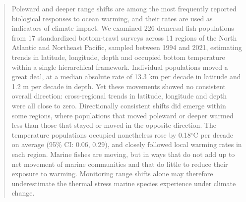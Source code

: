 \documentclass[9pt,twocolumn,twoside]{pnas-new}
\begin{document}

\begin{abstract}
Poleward and deeper range shifts are among the most frequently reported biological responses to ocean warming, and their rates are used as indicators of climate impact. We examined 226 demersal fish populations from 17 standardized bottom-trawl surveys across 11 regions of the North Atlantic and Northeast Pacific, sampled between 1994 and 2021, estimating trends in latitude, longitude, depth and occupied bottom temperature within a single hierarchical framework. Individual populations moved a great deal, at a median absolute rate of 13.3 km per decade in latitude and 1.2 m per decade in depth. Yet these movements showed no consistent overall direction: cross-regional trends in latitude, longitude and depth were all close to zero. Directionally consistent shifts did emerge within some regions, where populations that moved poleward or deeper warmed less than those that stayed or moved in the opposite direction. The temperature populations occupied nonetheless rose by 0.18$^\circ$C per decade on average (95\% CI:
0.06, 0.29), and closely followed local warming rates in each region. Marine fishes are moving, but in ways that do not add up to net movement of marine communities and that do little to reduce their exposure to warming. Monitoring range shifts alone may therefore underestimate the thermal stress marine species experience under climate change.
\end{abstract}



\maketitle
\thispagestyle{firststyle}

\Firstpage

\end{document}
